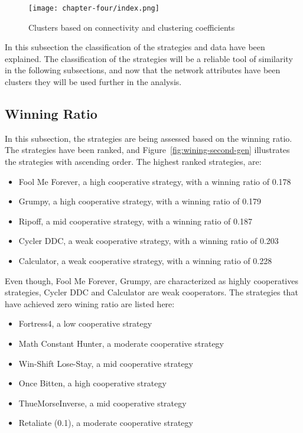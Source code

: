 \begin{figure}[H]
	\texttt{[image: chapter-four/index.png]}
	\caption{Clusters based on connectivity and clustering coefficients}
	\label{fig:clusters}
\end{figure}

In this subsection the classification of the strategies and data have been
explained. The classification of the strategies will be a reliable tool
of similarity in the following subsections, and now that the network
attributes have been clusters they will be used further in the analysis.

\subsection{Winning Ratio}
In this subsection, the strategies are being assessed based on the winning ratio.
The strategies have been ranked, and Figure~\ref{fig:wining-second-gen}
illustrates the strategies with ascending order. The highest ranked strategies,
are:
\begin{itemize}
	\item Fool Me Forever, a high cooperative strategy, with a winning ratio of 0.178
	\item Grumpy, a high cooperative strategy, with a winning ratio of 0.179
	\item Ripoff, a mid cooperative strategy, with a winning ratio of 0.187
	\item Cycler DDC, a weak cooperative strategy, with a winning ratio of 0.203
	\item Calculator, a weak cooperative strategy, with a winning ratio of 0.228
\end{itemize}

Even though, Fool Me Forever, Grumpy, are characterized as highly
cooperatives strategies, Cycler DDC and Calculator are weak cooperators. The
strategies that have achieved zero wining ratio are listed here:
\begin{itemize}
	\item Fortress4, a low cooperative strategy
	\item Math Constant Hunter, a moderate cooperative strategy
	\item Win-Shift Lose-Stay, a mid cooperative strategy
	\item Once Bitten, a high cooperative strategy
	\item ThueMorseInverse, a mid cooperative strategy
	\item Retaliate (0.1), a moderate cooperative strategy
\end{itemize}


